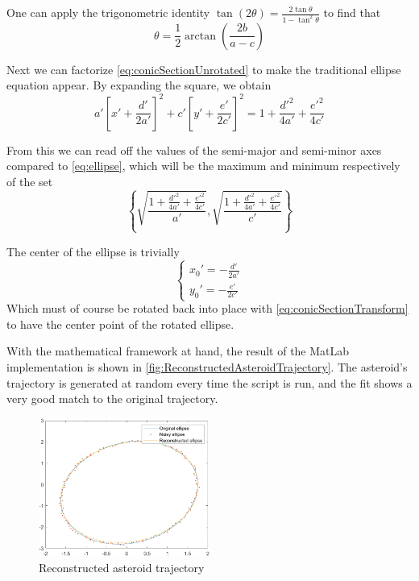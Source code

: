 One can apply the trigonometric identity $\tan(2\theta) = \frac{2\tan\theta}{1 - \tan^2\theta}$ to find that
\begin{equation}
    \theta = \frac{1}{2} \arctan \left( \frac{2b}{a - c} \right)
\end{equation}

Next we can factorize \autoref{eq:conicSectionUnrotated} to make the traditional ellipse equation appear. By expanding the square, we obtain
\begin{equation}
    a' \left[ x' + \frac{d'}{2a'}\right]^2 + c' \left[ y' + \frac{e'}{2c'}\right]^2 = 1 + \frac{d'^2}{4 a'} + \frac{e'^2}{4 c'}
\end{equation}

From this we can read off the values of the semi-major and semi-minor axes compared to \autoref{eq:ellipse}, which will be the maximum and minimum respectively of the set 
\begin{equation}
    \left\{ \sqrt{\frac{1 + \frac{d'^2}{4 a'} + \frac{e'^2}{4 c'}}{a'}}, \sqrt{\frac{1 + \frac{d'^2}{4 a'} + \frac{e'^2}{4 c'}}{c'}}  \right\} 
\end{equation}

The center of the ellipse is trivially
\begin{equation}
    \begin{cases}
        x_0' = -\frac{d'}{2a'} \\
        y_0' = -\frac{e'}{2c'}
    \end{cases}
\end{equation}
Which must of course be rotated back into place with \autoref{eq:conicSectionTransform} to have the center point of the rotated ellipse.

With the mathematical framework at hand, the result of the MatLab implementation is shown in \autoref{fig:ReconstructedAsteroidTrajectory}. The asteroid's trajectory is generated at random every time the script is run, and the fit shows a very good match to the original trajectory.
\begin{figure}[!ht]
    \centering
    \includegraphics[width=0.5\textwidth]{Doc/Graphics/Part3/ReconstructedAsteroidTrajectory.png}
    \caption{Reconstructed asteroid trajectory}
    \label{fig:ReconstructedAsteroidTrajectory}
\end{figure}
\FloatBarrier

